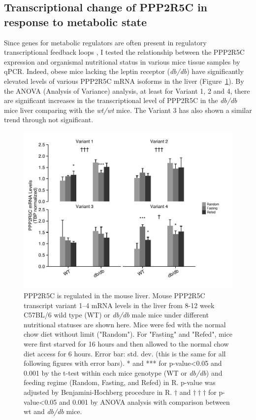 \subsection{Transcriptional change of PPP2R5C in response to metabolic state}

Since genes for metabolic regulators are often present in regulatory transcriptional feedback loops \cite{amemiya-kudo_promoter_2000}, I tested the relationship between the PPP2R5C expression and organismal nutritional status in various mice tissue samples by qPCR. Indeed, obese mice lacking the leptin receptor (\textit{db/db}) have significantly elevated levels of various PPP2R5C mRNA isoforms in the liver (Figure~\ref{fig:fig2.1}). By the \gls{ANOVA} (Analysis of Variance) analysis, at least for Variant 1, 2 and 4, there are significant increases in the transcriptional level of PPP2R5C in the \textit{db/db} mice liver comparing with the \textit{wt/wt} mice. The Variant 3 has also shown a similar trend through not significant. 

\begin{figure}[!tb]
\centering
\includegraphics[width=1\textwidth]{figs/fig2-1 liver ppp2r5c.pdf}
\caption[PPP2R5C expression in the liver]{\footnotesize PPP2R5C is regulated in the mouse liver. Mouse PPP2R5C transcript variant 1--4 mRNA levels in the liver from 8-12 week C57BL/6 wild type (WT) or \textit{db/db} male mice under different nutritional statuses are shown here. Mice were fed with the normal chow diet without limit ("Random"). For "Fasting" and "Refed", mice were first starved for 16 hours and then allowed to the normal chow diet access for 6 hours. Error bar: std. dev. (this is the same for all following figures with error bars). * and *** for p-value<0.05 and 0.001 by the t-test within each mice genotype (WT or \textit{db/db}) and feeding regime (Random, Fasting, and Refed) in R. p-value was adjusted by Benjamini-Hochberg procedure in R. $\dagger$ and $\dagger\dagger\dagger$ for p-value<0.05 and 0.001 by \gls{ANOVA} analysis with comparison between wt and \textit{db/db} mice.}
\label{fig:fig2.1}
\end{figure}


